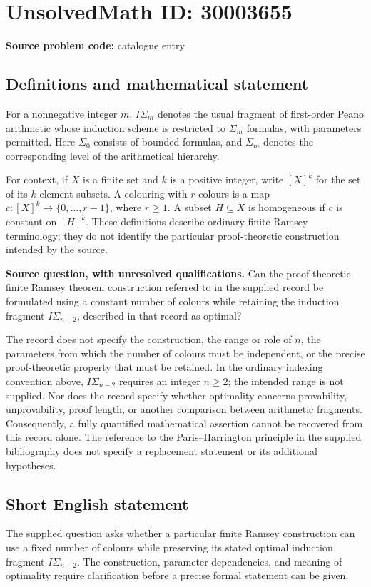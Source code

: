 \documentclass[11pt]{article}
\begin{document}
\section*{UnsolvedMath ID: 30003655}
\textbf{Source problem code:} catalogue entry
\subsection{Definitions and mathematical statement}
For a nonnegative integer \(m\), \(I\Sigma_m\) denotes the usual fragment of first-order Peano arithmetic whose induction scheme is restricted to \(\Sigma_m\) formulas, with parameters permitted. Here \(\Sigma_0\) consists of bounded formulas, and \(\Sigma_m\) denotes the corresponding level of the arithmetical hierarchy.

For context, if \(X\) is a finite set and \(k\) is a positive integer, write \([X]^k\) for the set of its \(k\)-element subsets. A colouring with \(r\) colours is a map \(c:[X]^k\to\{0,\ldots,r-1\}\), where \(r\geq 1\). A subset \(H\subseteq X\) is homogeneous if \(c\) is constant on \([H]^k\). These definitions describe ordinary finite Ramsey terminology; they do not identify the particular proof-theoretic construction intended by the source.

\textbf{Source question, with unresolved qualifications.} Can the proof-theoretic finite Ramsey theorem construction referred to in the supplied record be formulated using a constant number of colours while retaining the induction fragment \(I\Sigma_{n-2}\), described in that record as optimal?

The record does not specify the construction, the range or role of \(n\), the parameters from which the number of colours must be independent, or the precise proof-theoretic property that must be retained. In the ordinary indexing convention above, \(I\Sigma_{n-2}\) requires an integer \(n\geq 2\); the intended range is not supplied. Nor does the record specify whether optimality concerns provability, unprovability, proof length, or another comparison between arithmetic fragments. Consequently, a fully quantified mathematical assertion cannot be recovered from this record alone. The reference to the Paris--Harrington principle in the supplied bibliography does not specify a replacement statement or its additional hypotheses.
\subsection{Short English statement}
The supplied question asks whether a particular finite Ramsey construction can use a fixed number of colours while preserving its stated optimal induction fragment \(I\Sigma_{n-2}\). The construction, parameter dependencies, and meaning of optimality require clarification before a precise formal statement can be given.
\end{document}
